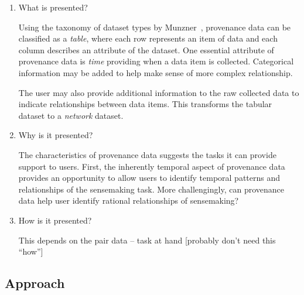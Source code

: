 \begin{enumerate}
	\item What is presented?
	
	Using the taxonomy of dataset types by Munzner~\cite{Munzner2014}, provenance data can be classified as a \emph{table}, where each row represents an item of data and each column describes an attribute of the dataset. One essential attribute of provenance data is \emph{time} providing when a data item is collected. Categorical information may be added to help make sense of more complex relationship.
	
	The user may also provide additional information to the raw collected data to indicate relationships between data items. This transforms the tabular dataset to a \emph{network} dataset.
	
	\item Why is it presented?
	
	The characteristics of provenance data suggests the tasks it can provide support to users. First, the inherently temporal aspect of provenance data provides an opportunity to allow users to identify temporal patterns and relationships of the sensemaking task. More challengingly, can provenance data help user identify rational relationships of sensemaking?
	
	\item How is it presented?
	
	This depends on the pair data -- task at hand [probably don't need this ``how'']
\end{enumerate}

%

\subsection{Approach}

